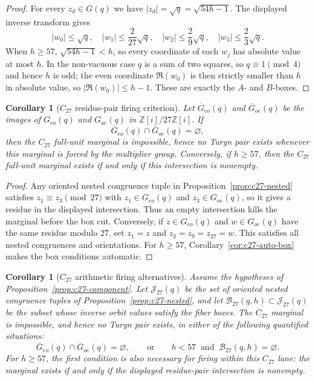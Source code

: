 \documentclass[11pt]{article}
\theoremstyle{plain}
\newtheorem{corollary}[theorem]{Corollary}
\theoremstyle{definition}
\theoremstyle{remark}
\newcommand{\Z}{\mathbb Z}
\begin{document}
\begin{proof}
For every $z_d\in G(q)$ we have $|z_d|=\sqrt q=\sqrt{54h-1}$.  The displayed
inverse transform gives
\[
  |w_0|\le\sqrt q,\quad |w_1|\le\frac{2}{27}\sqrt q,\quad
  |w_2|\le\frac{2}{9}\sqrt q,\quad |w_3|\le\frac{2}{3}\sqrt q .
\]
When $h\ge57$, $\sqrt{54h-1}<h$, so every coordinate of each $w_j$ has absolute
value at most $h$.  In the non-vacuous case $q$ is a sum of two squares, so
$q\equiv1\pmod4$ and hence $h$ is odd; the even coordinate $\Re(w_0)$ is then
strictly smaller than $h$ in absolute value, so $|\Re(w_0)|\le h-1$.  These are
exactly the $A$- and $B$-boxes.
\end{proof}

\begin{corollary}[$C_{27}$ residue-pair firing criterion]\label{cor:c27-residue-pair}
Let $\overline G_{eo}(q)$ and $\overline G_{oe}(q)$ be the images of
$G_{eo}(q)$ and $G_{oe}(q)$ in $\Z[i]/27\Z[i]$.  If
\[
  \overline G_{eo}(q)\cap\overline G_{oe}(q)=\varnothing,
\]
then the $C_{27}$ full-unit marginal is impossible, hence no Turyn pair exists
whenever this marginal is forced by the multiplier group.  Conversely, if
$h\ge57$, then the $C_{27}$ full-unit marginal exists if and only if this
intersection is nonempty.
\end{corollary}

\begin{proof}
Any oriented nested congruence tuple in Proposition~\ref{prop:c27-nested}
satisfies $z_1\equiv z_3\pmod{27}$ with $z_1\in G_{eo}(q)$ and
$z_3\in G_{oe}(q)$, so it gives a residue in the displayed intersection.  Thus
an empty intersection kills the marginal before the box cut.  Conversely, if
$z\in G_{eo}(q)$ and $w\in G_{oe}(q)$ have the same residue modulo $27$, set
$z_1=z$ and $z_3=z_9=z_{27}=w$.  This satisfies all nested congruences and
orientations.  For $h\ge57$, Corollary~\ref{cor:c27-auto-box} makes the box
conditions automatic.
\end{proof}

\begin{corollary}[$C_{27}$ arithmetic firing alternatives]\label{cor:c27-arithmetic-firing}
Assume the hypotheses of Proposition~\ref{prop:c27-component}.  Let
$\mathcal J_{27}(q)$ be the set of oriented nested congruence tuples of
Proposition~\ref{prop:c27-nested}, and let $\mathcal B_{27}(q,h)\subset
\mathcal J_{27}(q)$ be the subset whose inverse orbit values satisfy the
fiber boxes.  The $C_{27}$ marginal is impossible, and hence no Turyn pair
exists, in either of the following quantified situations:
\[
  \overline G_{eo}(q)\cap\overline G_{oe}(q)=\varnothing,
  \qquad\text{or}\qquad
  h<57\ \text{ and }\ \mathcal B_{27}(q,h)=\varnothing .
\]
For $h\ge57$, the first condition is also necessary for firing within this
$C_{27}$ lane: the marginal exists if and only if the displayed residue-pair
intersection is nonempty.
\end{corollary}
\end{document}
